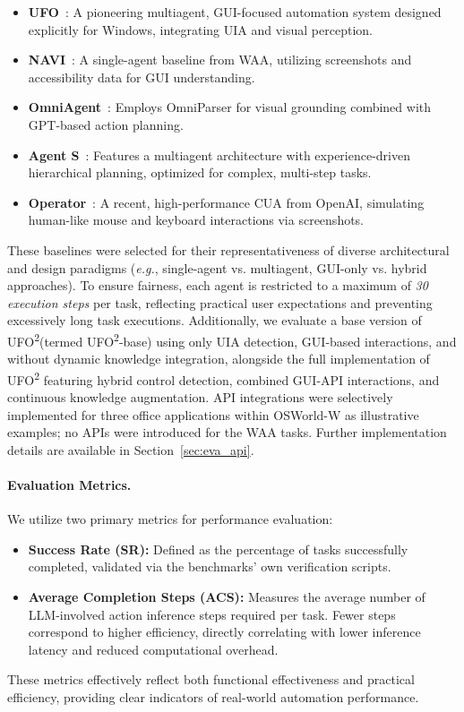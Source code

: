 \documentclass[sigplan,10pt]{acmart}
\newcommand{\name}{\textsc{UFO}\textsuperscript{2}\xspace}
\newcommand{\eg}{\textit{e.g.},\xspace}
\begin{document}
\begin{itemize} 
    \item \textbf{UFO}~\cite{zhang2024ufo}: A pioneering multiagent, GUI-focused automation system designed explicitly for Windows, integrating UIA and visual perception.
    \item \textbf{NAVI}~\cite{bonatti2024windows}: A single-agent baseline from WAA, utilizing screenshots and accessibility data for GUI understanding.
    \item \textbf{OmniAgent}~\cite{lu2024omniparser}: Employs OmniParser for visual grounding combined with GPT-based action planning.
    \item \textbf{Agent S}~\cite{agasheagent}: Features a multiagent architecture with experience-driven hierarchical planning, optimized for complex, multi-step tasks.
    \item \textbf{Operator}~\cite{cua2025}: A recent, high-performance CUA from OpenAI, simulating human-like mouse and keyboard interactions via screenshots.
\end{itemize}
These baselines were selected for their representativeness of diverse architectural and design paradigms (\eg single-agent vs. multiagent, GUI-only vs. hybrid approaches). To ensure fairness, each agent is restricted to a maximum of \textit{30 execution steps} per task, reflecting practical user expectations and preventing excessively long task executions. Additionally, we evaluate a base version of \name (termed \name-base) using only UIA detection, GUI-based interactions, and without dynamic knowledge integration, alongside the full implementation of \name featuring hybrid control detection, combined GUI-API interactions, and continuous knowledge augmentation. API integrations were selectively implemented for three office applications within OSWorld-W as illustrative examples; no APIs were introduced for the WAA tasks. Further implementation details are available in Section~\ref{sec:eva_api}.

\paragraph{Evaluation Metrics.} 
We utilize two primary metrics for performance evaluation:

\begin{itemize} 
    \item \textbf{Success Rate (SR):} Defined as the percentage of tasks successfully completed, validated via the benchmarks' own verification scripts.
    \item \textbf{Average Completion Steps (ACS):} Measures the average number of LLM-involved action inference steps required per task. Fewer steps correspond to higher efficiency, directly correlating with lower inference latency and reduced computational overhead.
\end{itemize}
These metrics effectively reflect both functional effectiveness and practical efficiency, providing clear indicators of real-world automation performance.
\end{document}
